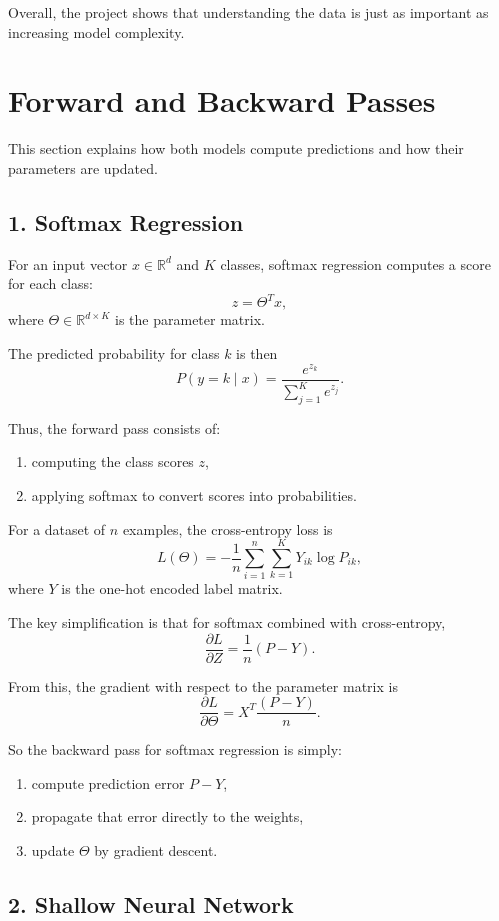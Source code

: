 \documentclass[11pt]{article}
\begin{document}
Overall, the project shows that understanding the data is just as important as increasing model complexity.

\section*{Forward and Backward Passes}

This section explains how both models compute predictions and how their parameters are updated.

\subsection*{1. Softmax Regression}

For an input vector $x \in \mathbb{R}^d$ and $K$ classes, softmax regression computes a score for each class:
\[
z = \Theta^T x,
\]
where $\Theta \in \mathbb{R}^{d \times K}$ is the parameter matrix.

The predicted probability for class $k$ is then
\[
P(y = k \mid x)
=
\frac{e^{z_k}}{\sum_{j=1}^{K} e^{z_j}}.
\]

Thus, the forward pass consists of:
\begin{enumerate}
    \item computing the class scores $z$,
    \item applying softmax to convert scores into probabilities.
\end{enumerate}

For a dataset of $n$ examples, the cross-entropy loss is
\[
L(\Theta)
=
-\frac{1}{n}\sum_{i=1}^{n}\sum_{k=1}^{K} Y_{ik}\log P_{ik},
\]
where $Y$ is the one-hot encoded label matrix.

The key simplification is that for softmax combined with cross-entropy,
\[
\frac{\partial L}{\partial Z}
=
\frac{1}{n}(P - Y).
\]

From this, the gradient with respect to the parameter matrix is
\[
\frac{\partial L}{\partial \Theta}
=
X^T \frac{(P - Y)}{n}.
\]

So the backward pass for softmax regression is simply:
\begin{enumerate}
    \item compute prediction error $P - Y$,
    \item propagate that error directly to the weights,
    \item update $\Theta$ by gradient descent.
\end{enumerate}

\subsection*{2. Shallow Neural Network}
\end{document}
